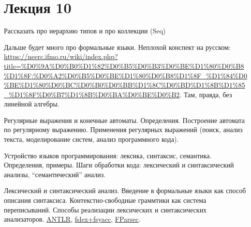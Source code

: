 \section{Лекция 10}

    	Рассказать про иерархию типов и про коллекции (Seq)

	Дальше будет много про формальные языки. Неплохой конспект на русском: \url{https://neerc.ifmo.ru/wiki/index.php?title=%D0%9A%D0%B0%D1%82%D0%B5%D0%B3%D0%BE%D1%80%D0%B8%D1%8F:%D0%A2%D0%B5%D0%BE%D1%80%D0%B8%D1%8F_%D1%84%D0%BE%D1%80%D0%BC%D0%B0%D0%BB%D1%8C%D0%BD%D1%8B%D1%85_%D1%8F%D0%B7%D1%8B%D0%BA%D0%BE%D0%B2}. Там, правда, без линейной алгебры.

    Регулярные выражения и конечные автоматы. Определения. Построение автомата по регулярному выражению. Применения регулярных выражений (поиск, анализ текста, моделирование систем, анализ программного кода).

    Устройство языков программирования: лексика, синтаксис, семантика. Определения, примеры. Шаги обработки кода: лексический и синтаксический анализы, ``семантический'' анализ.
    
    Лексический и синтаксический анализ. Введение в формальные языки как способ описания синтаксиса. Контекстно-свободные граммтики как система переписываний. 
    Способы реализации лексических и синтаксических анализаторов. \href{https://www.antlr.org/}{ANTLR}, \href{https://fsprojects.github.io/FsLexYacc/}{fslex+fsyacc}, \href{https://www.quanttec.com/fparsec/about/}{FParsec}.

